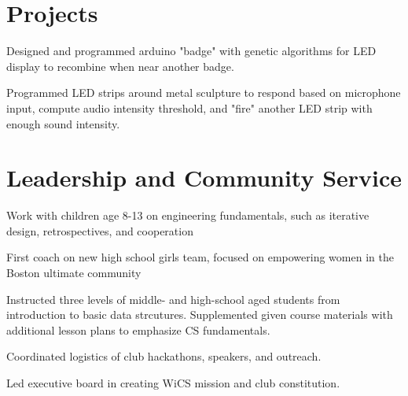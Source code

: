 \documentclass[]{csaund_resume-openfont}
\begin{document}
\begin{minipage}[t]{0.66\textwidth}

\section{Projects}
\begin{tightemize}
\item Designed and programmed arduino "badge" with  genetic algorithms for LED display to recombine when near another badge.
\end{tightemize}
\sectionsep
{}
\begin{tightemize}
\item Programmed LED strips around metal sculpture to respond based on microphone input, compute audio intensity threshold, and "fire" another LED strip with enough sound intensity.
\end{tightemize}
\sectionsep

\end{minipage}

\pagebreak


\section{Leadership and Community Service}
Work with children age 8-13 on engineering fundamentals, such as iterative design, retrospectives, and cooperation
\sectionsep

First coach on new high school girls team, focused on empowering women in the Boston ultimate community
\sectionsep

Instructed three levels of middle- and high-school aged students from introduction to basic data strcutures. Supplemented given course materials with additional lesson plans to emphasize CS fundamentals.
\sectionsep

\begin{tightemize}
\item Coordinated logistics of club hackathons, speakers, and outreach.
\item Led executive board in creating WiCS mission and club constitution.
\end{tightemize}
\sectionsep
\end{document}
